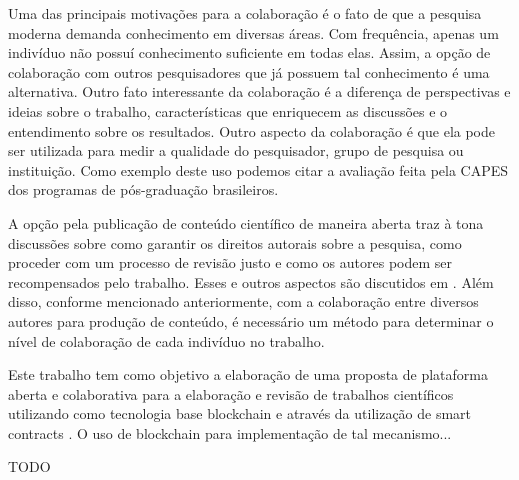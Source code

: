 Uma das principais motivações para a colaboração é o fato de que a pesquisa moderna demanda conhecimento em diversas áreas. Com frequência, apenas um indivíduo não possuí conhecimento suficiente em todas elas. Assim, a opção de colaboração com outros pesquisadores que já possuem tal conhecimento é uma alternativa. Outro fato interessante da colaboração é a diferença de perspectivas e ideias sobre o trabalho, características que enriquecem as discussões e o entendimento sobre os resultados. Outro aspecto da colaboração é que ela pode ser utilizada para medir a qualidade do pesquisador, grupo de pesquisa ou instituição. Como exemplo deste uso podemos citar a avaliação feita pela CAPES dos programas de pós-graduação brasileiros.

A opção pela publicação de conteúdo científico de maneira aberta traz à tona discussões sobre como garantir os direitos autorais sobre a pesquisa, como proceder com um processo de revisão justo e como os autores podem ser recompensados pelo trabalho. Esses e outros aspectos são discutidos em \cite{OpenAccessAnalysis2004}. Além disso, conforme mencionado anteriormente, com a colaboração entre diversos autores para produção de conteúdo, é necessário um método para determinar o nível de colaboração de cada indivíduo no trabalho.

Este trabalho tem como objetivo a elaboração de uma proposta de plataforma aberta e colaborativa para a elaboração e revisão de trabalhos científicos utilizando como tecnologia base blockchain e através da utilização de smart contracts \cite{SmartContract2017}. O uso de blockchain para implementação de tal mecanismo...


TODO
